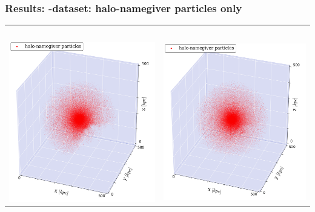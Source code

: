 \begin{frame}
	\frametitle{Results: \dt-dataset: halo-namegiver particles only}
	
	\begin{tabular}{c c}
		\phewon\ 	& \simple \\[1.5em]
		{\includegraphics[width = .49\textwidth]{../report/images/dice-two/dice-two-halo-only-phew.png}} \hspace*{-1em} 	& 
		{\includegraphics[width = .49\textwidth]{../report/images/dice-two/dice-two-halo-only-nosaddle.png}}
	\end{tabular}
\end{frame}




%	
%
%
%
%	



